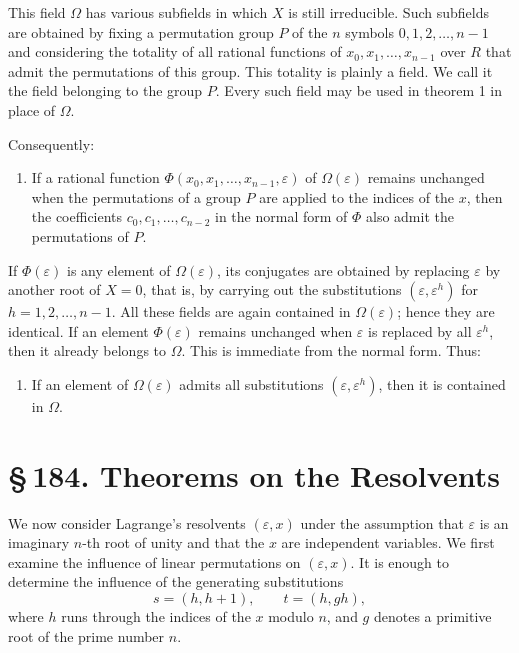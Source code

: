 \documentclass[11pt]{article}
\providecommand{\sect}[2]{\section*{\S\,#1. #2}}
\begin{document}
This field $\Omega$ has various subfields in which $X$ is still irreducible. Such subfields are obtained by fixing a permutation group $P$ of the $n$ symbols $0,1,2,\ldots,n-1$ and considering the totality of all rational functions of $x_0,x_1,\ldots,x_{n-1}$ over $R$ that admit the permutations of this group. This totality is plainly a field. We call it the field belonging to the group $P$. Every such field may be used in theorem 1 in place of $\Omega$.

Consequently:

\begin{enumerate}[resume,label=\arabic*.]
\item If a rational function $\Phi(x_0,x_1,\ldots,x_{n-1},\varepsilon)$ of $\Omega(\varepsilon)$ remains unchanged when the permutations of a group $P$ are applied to the indices of the $x$, then the coefficients $c_0,c_1,\ldots,c_{n-2}$ in the normal form of $\Phi$ also admit the permutations of $P$.
\end{enumerate}

If $\Phi(\varepsilon)$ is any element of $\Omega(\varepsilon)$, its conjugates are obtained by replacing $\varepsilon$ by another root of $X=0$, that is, by carrying out the substitutions $(\varepsilon,\varepsilon^h)$ for $h=1,2,\ldots,n-1$. All these fields are again contained in $\Omega(\varepsilon)$; hence they are identical. If an element $\Phi(\varepsilon)$ remains unchanged when $\varepsilon$ is replaced by all $\varepsilon^h$, then it already belongs to $\Omega$. This is immediate from the normal form. Thus:

\begin{enumerate}[resume,label=\arabic*.]
\item If an element of $\Omega(\varepsilon)$ admits all substitutions $(\varepsilon,\varepsilon^h)$, then it is contained in $\Omega$.
\end{enumerate}

\sect{184}{Theorems on the Resolvents}

We now consider Lagrange's resolvents $(\varepsilon,x)$ under the assumption that $\varepsilon$ is an imaginary $n$-th root of unity and that the $x$ are independent variables. We first examine the influence of linear permutations on $(\varepsilon,x)$. It is enough to determine the influence of the generating substitutions
\begin{equation}\tag{1}
  s=(h,h+1),\qquad t=(h,gh),
\end{equation}
where $h$ runs through the indices of the $x$ modulo $n$, and $g$ denotes a primitive root of the prime number $n$.
\end{document}
